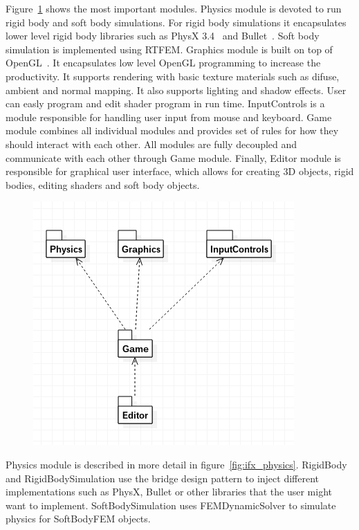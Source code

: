\documentclass[en]{minipw} %
\begin{document}
Figure~\ref{fig:ifx_general} shows the most important modules. Physics module is devoted to run rigid body and soft body simulations. For rigid body simulations it encapsulates lower level rigid body libraries such as PhysX 3.4~\cite{physx} and Bullet~\cite{bullet}. Soft body simulation is implemented using RTFEM.
Graphics module is built on top of OpenGL~\cite{opengl}. It encapsulates low level OpenGL programming to increase the productivity. It supports rendering with basic texture materials such as difuse, ambient and normal mapping. It also supports lighting and shadow effects. User can easly program and edit shader program in run time.
InputControls is a module responsible for handling user input from mouse and keyboard.
Game module combines all individual modules and provides set of rules for how they should interact with each other. All modules are fully decoupled and communicate with each other through Game module.
Finally, Editor module is responsible for graphical user interface, which allows for creating 3D objects, rigid bodies, editing shaders and soft body objects.

\begin{figure}[h!]
\centering
\includegraphics[scale=0.5]{pictures/ifx_general.png}
\caption[Logo MiNI]{}
\label{fig:ifx_general}
\end{figure}

Physics module is described in more detail in figure~\ref{fig:ifx_physics}. RigidBody and RigidBodySimulation use the bridge design pattern to inject different implementations such as PhysX, Bullet or other libraries that the user might want to implement. SoftBodySimulation uses FEMDynamicSolver to simulate physics for SoftBodyFEM objects.
\end{document}
